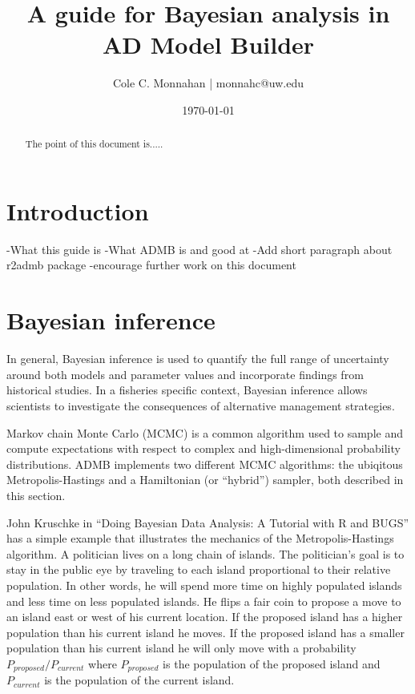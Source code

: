 \documentclass{article}\usepackage[]{graphicx}\usepackage[]{color}
\begin{document}
\title{A guide for Bayesian analysis in AD Model Builder}
\author{Cole C. Monnahan | monnahc@uw.edu}
\date{\today{}}
\maketitle
\begin{abstract}
  The point of this document is.....
\end{abstract}

\tableofcontents

\section{Introduction}
-What this guide is
-What ADMB is and good at
-Add short paragraph about r2admb package
-encourage further work on this document
\section{Bayesian inference}
In general, Bayesian inference is used to quantify the full
range of uncertainty around both models and parameter values
and incorporate findings from historical studies. In a
fisheries specific context, Bayesian inference allows
scientists to investigate the consequences of alternative
management strategies.

Markov chain Monte Carlo (MCMC) is a common algorithm used
to sample and compute expectations with respect to complex
and high-dimensional probability distributions.  ADMB
implements two different MCMC algorithms: the ubiqitous
Metropolis-Hastings and a Hamiltonian (or ``hybrid'')
sampler, both described in this section.

John Kruschke in ``Doing Bayesian Data Analysis: A Tutorial
with R and BUGS'' has a simple example that illustrates the
mechanics of the Metropolis-Hastings algorithm. A politician
lives on a long chain of islands. The politician's goal is
to stay in the public eye by traveling to each island
proportional to their relative population. In other words,
he will spend more time on highly populated islands and less
time on less populated islands. He flips a fair coin to
propose a move to an island east or west of his current
location. If the proposed island has a higher population
than his current island he moves. If the proposed island has
a smaller population than his current island he will only
move with a probability $P_{proposed} / P_{current}$ where
$P_{proposed}$ is the population of the proposed island and
$P_{current}$ is the population of the current island.
\end{document}
